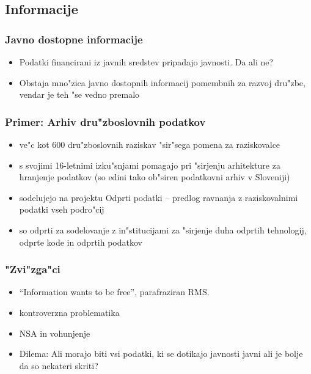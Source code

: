 \documentclass{beamer}
\begin{document}
\subsection{Informacije}

\begin{frame}
\frametitle{Javno dostopne informacije}
\begin{itemize}
\item Podatki financirani iz javnih sredstev pripadajo javnosti. Da ali ne?
\item Obstaja mno"zica javno dostopnih informacij pomembnih za razvoj dru"zbe, vendar je teh "se vedno premalo
\end{itemize}
\end{frame}

\begin{frame}
\frametitle{Primer: Arhiv dru"zboslovnih podatkov}
\begin{itemize}
\item ve"c kot 600 dru"zboslovnih raziskav "sir"sega pomena za raziskovalce 
\item s svojimi 16-letnimi izku"snjami pomagajo pri "sirjenju arhitekture za hranjenje podatkov (so edini tako ob"siren podatkovni arhiv v Sloveniji)
\item sodelujejo na projektu Odprti podatki -- predlog ravnanja z raziskovalnimi podatki vseh podro"cij
\item so odprti za sodelovanje z in"stitucijami za "sirjenje duha odprtih tehnologij, odprte kode in odprtih podatkov
\end{itemize}
\end{frame}

\begin{frame}
\frametitle{"Zvi"zga"ci}
\begin{itemize}
\item ``Information wants to be free'', parafraziran RMS.
\item kontroverzna problematika
\item NSA in vohunjenje
\item Dilema: Ali morajo biti vsi podatki, ki se dotikajo javnosti javni ali je bolje da so nekateri skriti?
\end{itemize}
\end{frame}
\end{document}
